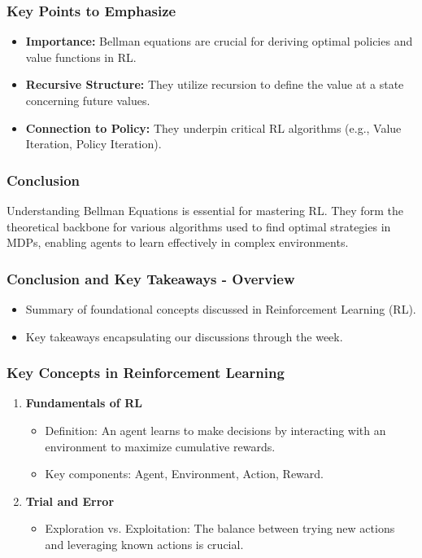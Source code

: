 \documentclass{beamer}
\begin{document}
\begin{frame}[fragile]
    \frametitle{Key Points to Emphasize}

    \begin{itemize}
        \item \textbf{Importance:} Bellman equations are crucial for deriving optimal policies and value functions in RL.
        \item \textbf{Recursive Structure:} They utilize recursion to define the value at a state concerning future values.
        \item \textbf{Connection to Policy:} They underpin critical RL algorithms (e.g., Value Iteration, Policy Iteration).
    \end{itemize}
    
\end{frame}

\begin{frame}[fragile]
    \frametitle{Conclusion}

    Understanding Bellman Equations is essential for mastering RL. They form the theoretical backbone for various algorithms used to find optimal strategies in MDPs, enabling agents to learn effectively in complex environments.

\end{frame}

\begin{frame}[fragile]
    \frametitle{Conclusion and Key Takeaways - Overview}
    \begin{itemize}
        \item Summary of foundational concepts discussed in Reinforcement Learning (RL).
        \item Key takeaways encapsulating our discussions through the week.
    \end{itemize}
\end{frame}

\begin{frame}[fragile]
    \frametitle{Key Concepts in Reinforcement Learning}
    \begin{enumerate}
        \item \textbf{Fundamentals of RL}
            \begin{itemize}
                \item Definition: An agent learns to make decisions by interacting with an environment to maximize cumulative rewards.
                \item Key components: Agent, Environment, Action, Reward.
            \end{itemize}
        \item \textbf{Trial and Error}
            \begin{itemize}
                \item Exploration vs. Exploitation: The balance between trying new actions and leveraging known actions is crucial.
            \end{itemize}
    \end{enumerate}
\end{frame}
\end{document}
